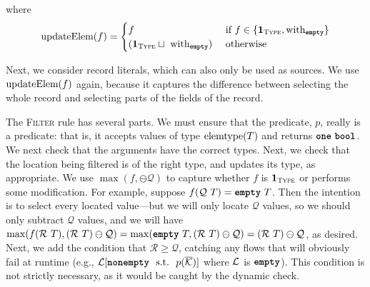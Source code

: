 \documentclass[nonacm, dvipsnames, sigconf]{acmart}
\begin{document}
where
\[
    \updateElem(f) =
    \begin{cases}
        f & \tif f \in \curlys{\id{\types}, \with_{\emptyq}} \\
        (\id{\types} \sqcup~\with_{\emptyq}) & \owise
    \end{cases}
\]

Next, we consider record literals, which can also only be used as sources.
We use $\updateElem(f)$ again, because it captures the difference between selecting the whole record and selecting parts of the fields of the record.
\begin{mathpar}
\end{mathpar}

The \textsc{Filter} rule has several parts.
We must ensure that the predicate, $p$, really is a predicate: that is, it accepts values of type $\elemtype(T)$ and returns $\exactlyone~\boolt$.
We next check that the arguments have the correct types.
Next, we check that the location being filtered is of the right type, and updates its type, as appropriate.
We use $\max(f, \ominus \mathcal{Q})$ to capture whether $f$ is $\id{\types}$ or performs some modification.
For example, suppose $f(\mathcal{Q}~T) = \emptyq~T$.
Then the intention is to select every located value---but we will only locate $\mathcal{Q}$ values, so we should only subtract $\mathcal{Q}$ values, and we will have $\max(f(\mathcal{R}~T), (\mathcal{R}~T) \ominus \mathcal{Q}) = \max(\emptyq~T, (\mathcal{R}~T) \ominus \mathcal{Q}) = (\mathcal{R}~T) \ominus \mathcal{Q}$, as desired.
Next, we add the condition that $\mathcal{R} \geq \mathcal{Q}$, catching any flows that will obviously fail at runtime (e.g., $\Loc[\nonempty~\tsuchthat~p(\overline{\LocK})]$ where $\Loc$ is $\emptyq$).
This condition is not strictly necessary, as it would be caught by the dynamic check.
\begin{mathpar}
\end{mathpar}
\end{document}
